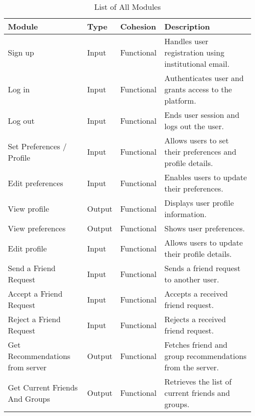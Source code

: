\documentclass[12pt,a4paper]{article}
\begin{document}
\begin{table}[H]
\hspace{-1.6cm}
    \renewcommand{\arraystretch}{1.25}
    \begin{tabular}{|p{4cm}|p{2cm}|p{3cm}|p{6cm}|}
        \hline
        \textbf{Module} & \textbf{Type} & \textbf{Cohesion} & \textbf{Description} \\
        \hline
        Sign up & Input & Functional & Handles user registration using institutional email. \\
        \hline
        Log in & Input & Functional & Authenticates user and grants access to the platform. \\
        \hline
        Log out & Input & Functional & Ends user session and logs out the user. \\
        \hline
        Set Preferences / Profile & Input & Functional & Allows users to set their preferences and profile details. \\
        \hline
        Edit preferences & Input & Functional & Enables users to update their preferences. \\
        \hline
        View profile & Output & Functional & Displays user profile information. \\
        \hline
        View preferences & Output & Functional & Shows user preferences. \\
        \hline
        Edit profile & Input & Functional & Allows users to update their profile details. \\
        \hline
        Send a Friend Request & Input & Functional & Sends a friend request to another user. \\
        \hline
        Accept a Friend Request & Input & Functional & Accepts a received friend request. \\
        \hline
        Reject a Friend Request & Input & Functional & Rejects a received friend request. \\
        \hline
        Get Recommendations from server & Output & Functional & Fetches friend and group recommendations from the server. \\
        \hline
        Get Current Friends And Groups & Output & Functional & Retrieves the list of current friends and groups. \\
        \hline
            \end{tabular}
    \caption{List of All Modules}
\end{table}
\end{document}
